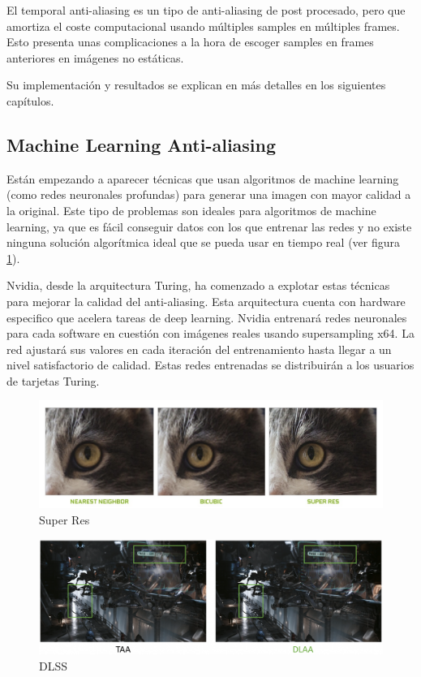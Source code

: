 \documentclass[withindex, glossary]{cam-thesis}
\begin{document}
El temporal anti-aliasing es un tipo de anti-aliasing de post procesado, pero que amortiza el coste computacional usando múltiples samples en múltiples frames. Esto presenta unas complicaciones a la hora de escoger samples en frames anteriores en imágenes no estáticas.

Su implementación y resultados se explican en más detalles en los siguientes capítulos.

\subsection{Machine Learning Anti-aliasing}

Están empezando a aparecer técnicas que usan algoritmos de machine learning (como redes neuronales profundas) para generar una imagen con mayor calidad a la original. Este tipo de problemas son ideales para algoritmos de machine learning, ya que es fácil conseguir datos con los que entrenar las redes y no existe ninguna solución algorítmica ideal que se pueda usar en tiempo real\cite{Huang-CVPR-2015}\cite{5459271} (ver figura \ref{superres}).

Nvidia, desde la arquitectura Turing, ha comenzado a explotar estas técnicas para mejorar la calidad del anti-aliasing\cite{turingwhitepaper}. Esta arquitectura cuenta con hardware especifico que acelera tareas de deep learning. Nvidia entrenará redes neuronales para cada software en cuestión con imágenes reales usando supersampling x64. La red ajustará sus valores en cada iteración del entrenamiento hasta llegar a un nivel satisfactorio de calidad. Estas redes entrenadas se distribuirán a los usuarios de tarjetas Turing.

\begin{figure}[!htbp]
    \includegraphics[width=\linewidth]{figures/superres.png}
    \caption{Super Res\cite{turingwhitepaper}}
    \label{superres}
\end{figure}

\begin{figure}[!htbp]
    \includegraphics[width=\linewidth]{figures/dlss.png}
    \caption{DLSS\cite{turingwhitepaper}}
    \label{fig:dlss}
\end{figure}
\end{document}
